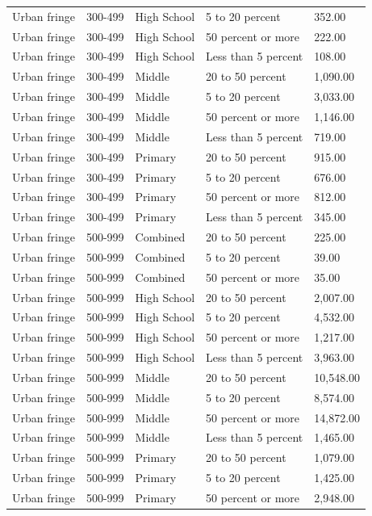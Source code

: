 \documentclass[man]{apa6}
\begin{document}
\begin{table}[tbp]
\begin{center}
\begin{threeparttable}
\begin{tabular}{lllll}
Urban fringe & 300-499 & High School & 5 to 20 percent & 352.00\\
Urban fringe & 300-499 & High School & 50 percent or more & 222.00\\
Urban fringe & 300-499 & High School & Less than 5 percent & 108.00\\
Urban fringe & 300-499 & Middle & 20 to 50 percent & 1,090.00\\
Urban fringe & 300-499 & Middle & 5 to 20 percent & 3,033.00\\
Urban fringe & 300-499 & Middle & 50 percent or more & 1,146.00\\
Urban fringe & 300-499 & Middle & Less than 5 percent & 719.00\\
Urban fringe & 300-499 & Primary & 20 to 50 percent & 915.00\\
Urban fringe & 300-499 & Primary & 5 to 20 percent & 676.00\\
Urban fringe & 300-499 & Primary & 50 percent or more & 812.00\\
Urban fringe & 300-499 & Primary & Less than 5 percent & 345.00\\
Urban fringe & 500-999 & Combined & 20 to 50 percent & 225.00\\
Urban fringe & 500-999 & Combined & 5 to 20 percent & 39.00\\
Urban fringe & 500-999 & Combined & 50 percent or more & 35.00\\
Urban fringe & 500-999 & High School & 20 to 50 percent & 2,007.00\\
Urban fringe & 500-999 & High School & 5 to 20 percent & 4,532.00\\
Urban fringe & 500-999 & High School & 50 percent or more & 1,217.00\\
Urban fringe & 500-999 & High School & Less than 5 percent & 3,963.00\\
Urban fringe & 500-999 & Middle & 20 to 50 percent & 10,548.00\\
Urban fringe & 500-999 & Middle & 5 to 20 percent & 8,574.00\\
Urban fringe & 500-999 & Middle & 50 percent or more & 14,872.00\\
Urban fringe & 500-999 & Middle & Less than 5 percent & 1,465.00\\
Urban fringe & 500-999 & Primary & 20 to 50 percent & 1,079.00\\
Urban fringe & 500-999 & Primary & 5 to 20 percent & 1,425.00\\
Urban fringe & 500-999 & Primary & 50 percent or more & 2,948.00\\

\end{tabular}
\end{threeparttable}
\end{center}
\end{table}
\end{document}
